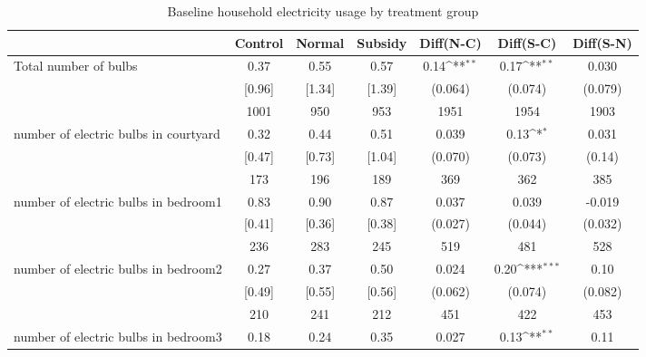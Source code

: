\begin{table}[htbp]\centering
\def\sym#1{\ifmmode^{#1}\else\(^{#1}\)\fi}
\caption{Baseline household electricity usage by treatment group \label{tab:"balance"}}
\begin{tabular*}{1\hsize}{@{\hskip\tabcolsep\extracolsep\fill}l*{1}{cccccc}}
\toprule
                                &  Control&   Normal&  Subsidy&Diff(N-C)         &Diff(S-C)         &Diff(S-N)         \\
\midrule
Total number of bulbs           &     0.37&     0.55&     0.57&     0.14\sym{**} &     0.17\sym{**} &    0.030         \\
                                &   [0.96]&   [1.34]&   [1.39]&  (0.064)         &  (0.074)         &  (0.079)         \\
                                &     1001&      950&      953&     1951         &     1954         &     1903         \\
number of electric bulbs in courtyard&     0.32&     0.44&     0.51&    0.039         &     0.13\sym{*}  &    0.031         \\
                                &   [0.47]&   [0.73]&   [1.04]&  (0.070)         &  (0.073)         &   (0.14)         \\
                                &      173&      196&      189&      369         &      362         &      385         \\
number of electric bulbs in bedroom1&     0.83&     0.90&     0.87&    0.037         &    0.039         &   -0.019         \\
                                &   [0.41]&   [0.36]&   [0.38]&  (0.027)         &  (0.044)         &  (0.032)         \\
                                &      236&      283&      245&      519         &      481         &      528         \\
number of electric bulbs in bedroom2&     0.27&     0.37&     0.50&    0.024         &     0.20\sym{***}&     0.10         \\
                                &   [0.49]&   [0.55]&   [0.56]&  (0.062)         &  (0.074)         &  (0.082)         \\
                                &      210&      241&      212&      451         &      422         &      453         \\
number of electric bulbs in bedroom3&     0.18&     0.24&     0.35&    0.027         &     0.13\sym{**} &     0.11         \\

\end{tabular*}
\end{table}
